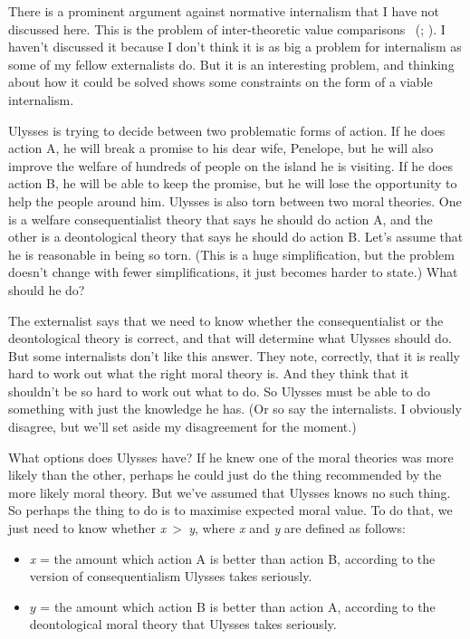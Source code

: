 \documentclass[
  10pt,
  letterpaper,
  twoside]{scrbook}
\providecommand{\tightlist}{%
  \setlength{\itemsep}{0pt}\setlength{\parskip}{0pt}}\usepackage{longtable,booktabs,array}
\begin{document}
There is a prominent argument against normative internalism that I have
not discussed here. This is the problem of inter-theoretic value
comparisons ~(;
). I haven't discussed it because
I don't think it is as big a problem for internalism as some of my
fellow externalists do. But it is an interesting problem, and thinking
about how it could be solved shows some constraints on the form of a
viable internalism.

{Ulysses} is trying to decide between two problematic forms of action.
If he does action A, he will break a promise to his dear wife,
{Penelope}, but he will also improve the welfare of hundreds of people
on the island he is visiting. If he does action B, he will be able to
keep the promise, but he will lose the opportunity to help the people
around him. {Ulysses} is also torn between two moral theories. One is a
welfare consequentialist theory that says he should do action A, and the
other is a deontological theory that says he should do action B. Let's
assume that he is reasonable in being so torn. (This is a huge
simplification, but the problem doesn't change with fewer
simplifications, it just becomes harder to state.) What should he do?

The externalist says that we need to know whether the consequentialist
or the deontological theory is correct, and that will determine what
{Ulysses} should do. But some internalists don't like this answer. They
note, correctly, that it is really hard to work out what the right moral
theory is. And they think that it shouldn't be so hard to work out what
to do. So {Ulysses} must be able to do something with just the knowledge
he has. (Or so say the internalists. I obviously disagree, but we'll set
aside my disagreement for the moment.)

What options does {Ulysses} have? If he knew one of the moral theories
was more likely than the other, perhaps he could just do the thing
recommended by the more likely moral theory. But we've assumed that
{Ulysses} knows no such thing. So perhaps the thing to do is to maximise
expected moral value. To do that, we just need to know whether
\emph{x}~\textgreater~\emph{y}, where \emph{x} and \emph{y} are defined
as follows:

\begin{itemize}
\tightlist
\item
  \emph{x} = the amount which action A is better than action B,
  according to the version of consequentialism {Ulysses} takes
  seriously.
\item
  \(y\) = the amount which action B is better than action A, according
  to the deontological moral theory that {Ulysses} takes seriously.
\end{itemize}
\end{document}
